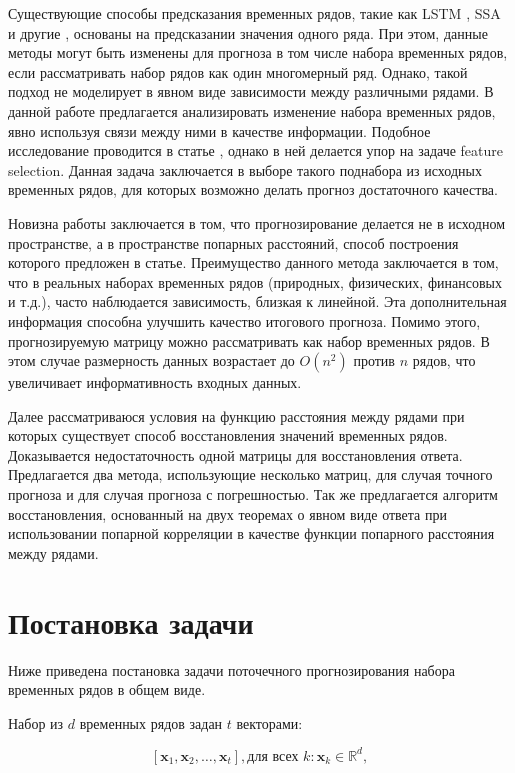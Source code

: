 \documentclass{article}
\begin{document}
	Существующие способы предсказания временных рядов, такие как LSTM \cite{LSTM}, SSA \cite{SSA} и другие \cite{Biosignals}, \cite{boyd2017multiperiod} основаны на предсказании значения одного ряда. При этом, данные методы могут быть изменены для прогноза в том числе набора временных рядов, если рассматривать набор рядов как один многомерный ряд. Однако, такой подход не моделирует в явном виде зависимости между различными рядами. В данной работе предлагается анализировать изменение набора временных рядов, явно используя связи между ними в качестве информации. Подобное исследование проводится в статье \cite{MulticorrelatedQuadratic}, однако в ней делается упор на задаче feature selection. Данная задача заключается в выборе такого поднабора из исходных временных рядов, для которых возможно делать прогноз достаточного качества.
	
	Новизна работы заключается в том, что прогнозирование делается не в исходном пространстве, а в пространстве попарных расстояний, способ построения которого предложен в статье. Преимущество данного метода заключается в том, что в реальных наборах временных рядов (природных, физических, финансовых и т.д.), часто наблюдается зависимость, близкая к линейной. Эта дополнительная информация способна улучшить качество итогового прогноза. Помимо этого, прогнозируемую матрицу можно рассматривать как набор временных рядов. В этом случае размерность данных возрастает до $O(n^2)$ против $n$ рядов, что увеличивает информативность входных данных.
	
	Далее рассматриваюся условия на функцию расстояния между рядами при которых существует способ восстановления значений временных рядов. Доказывается недостаточность одной матрицы для восстановления ответа. Предлагается два метода, использующие несколько матриц, для случая точного прогноза и для случая прогноза с погрешностью. Так же предлагается алгоритм восстановления, основанный на двух теоремах о явном виде ответа при использовании попарной корреляции в качестве функции попарного расстояния между рядами.

\section{Постановка задачи}

Ниже приведена постановка задачи поточечного прогнозирования набора временных рядов в общем виде.

Набор из $d$ временных рядов задан $t$ векторами:

$$[\mathbf{x}_1, \mathbf{x}_2, \ldots, \mathbf{x}_t], \text{для всех } k: \mathbf{x}_k \in \mathbb{R}^d, $$
\end{document}
